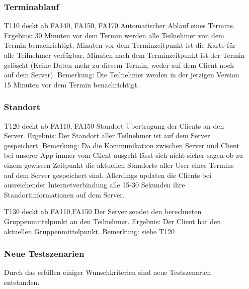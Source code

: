 \documentclass{scrartcl}
\begin{document}
\begin{itemize}
	\subsubsection{Terminablauf}
	
	\item[T110] deckt ab FA140, FA150, FA170 \newline
	Automatischer Ablauf eines Termins. \newline
	Ergebnis: 30 Minuten vor dem Termin werden alle Teilnehmer von dem Termin benachrichtigt.   Minuten vor dem Terminzeitpunkt ist die Karte für alle Teilnehmer verfügbar.   Minuten nach dem Terminzeitpunkt ist der Termin gelöscht (Keine Daten mehr zu diesem Termin, weder auf dem Client noch auf dem Server).
	Bemerkung: Die Teilnehmer werden in der jetzigen Version 15 Minuten vor dem Termin benachrichtigt. 
	
	\subsubsection{Standort}
	\item[T120] deckt ab FA110, FA150 \newline
	Standort Übertragung der Clients an den Server.  \newline
	Ergebnis: Der Standort aller Teilnehmer ist auf dem Server gespeichert. \newline
	Bemerkung: Da die Kommunikation zwischen Server und Client bei unserer App immer vom Client ausgeht lässt sich nicht sicher sagen ob zu einem gewissen Zeitpunkt die aktuellen Standorte aller User eines Termins auf dem Server gespeichert sind. Allerdings updaten die Clients bei ausreichender Internetverbindung alle 15-30 Sekunden ihre Standortinformationen auf dem Server.
	
	\item[T130]  deckt ab FA110,FA150 \newline
	Der Server sendet den berechneten Gruppenmittelpunkt an den Teilnehmer. \newline
	Ergebnis: Der Client hat den aktuellen Gruppenmittelpunkt.\newline
	Bemerkung: siehe T120 
	

	\subsubsection{Neue Testszenarien}
	Durch das erfüllen einiger Wunschkriterien sind neue Testszenarien entstanden.


\end{itemize}
\end{document}
